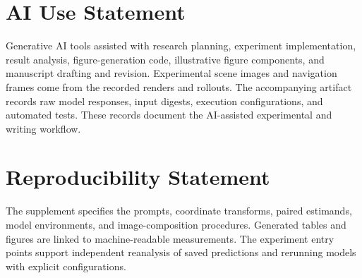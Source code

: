 \section*{AI Use Statement}
Generative AI tools assisted with research planning, experiment implementation,
result analysis, figure-generation code, illustrative figure components, and
manuscript drafting and revision. Experimental scene images and navigation
frames come from the recorded renders and rollouts.
The accompanying artifact records raw model responses, input digests, execution
configurations, and automated tests. These records document the AI-assisted
experimental and writing workflow.

\section*{Reproducibility Statement}
The supplement specifies the prompts, coordinate transforms, paired estimands,
model environments, and image-composition procedures. Generated tables and
figures are linked to machine-readable measurements. The experiment entry
points support independent reanalysis of saved predictions and rerunning models
with explicit configurations.
